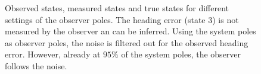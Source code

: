 \begin{figure}[h]
\begin{subfigure}{0.49\textwidth}
	\end{subfigure}	
	\caption{Observed states, measured states and true states for different settings of the observer poles. The heading error (state 3) is not measured by the observer an can be inferred. Using the system poles as observer poles, the noise is filtered out for the observed heading error. However, already at $95\%$ of the system poles, the observer follows the noise.}
	\label{fig:observer_result_states}
\end{figure}